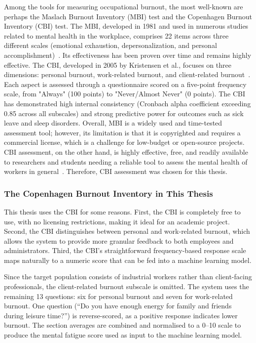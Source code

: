 \documentclass[12pt,a4paper]{article}
\begin{document}
Among the tools for measuring occupational burnout, the most well-known are perhaps the Maslach Burnout Inventory (MBI) test and the Copenhagen Burnout Inventory (CBI) test. The MBI, developed in 1981 and used in numerous studies related to mental health in the workplace, comprises 22 items across three different scales (emotional exhaustion, depersonalization, and personal accomplishment)~\cite{maslach1981}. Its effectiveness has been proven over time and remains highly effective. The CBI, developed in 2005 by Kristensen et al., focuses on three dimensions: personal burnout, work-related burnout, and client-related burnout~\cite{kristensen2005}. Each aspect is assessed through a questionnaire scored on a five-point frequency scale, from "Always" (100 points) to "Never/Almost Never" (0 points). The CBI has demonstrated high internal consistency (Cronbach alpha coefficient exceeding 0.85 across all subscales) and strong predictive power for outcomes such as sick leave and sleep disorders. Overall, MBI is a widely used and time-tested assessment tool; however, its limitation is that it is copyrighted and requires a commercial license, which is a challenge for low-budget or open-source projects. CBI assessment, on the other hand, is highly effective, free, and readily available to researchers and students needing a reliable tool to assess the mental health of workers in general~\cite{kristensen2005}. Therefore, CBI assessment was chosen for this thesis.

\subsubsection{The Copenhagen Burnout Inventory in This Thesis}

This thesis uses the CBI for some reasons. First, the CBI is
completely free to use, with no licensing restrictions, making it ideal for
an academic project. Second, the CBI distinguishes between personal and
work-related burnout, which allows the system to provide more granular
feedback to both employees and administrators. Third, the CBI's
straightforward frequency-based response scale maps naturally to a numeric
score that can be fed into a machine learning model.

Since the target population consists of industrial workers rather than
client-facing professionals, the client-related burnout subscale is omitted.
The system uses the remaining 13 questions: six for personal burnout and
seven for work-related burnout. One question (``Do you have enough energy
for family and friends during leisure time?'') is reverse-scored, as a
positive response indicates lower burnout. The section averages are combined
and normalised to a 0--10 scale to produce the mental fatigue score used as
input to the machine learning model.
\end{document}
